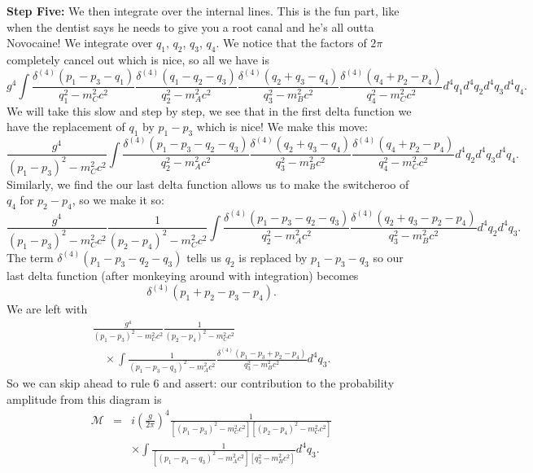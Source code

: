 \textbf{Step Five:} We then integrate over the internal lines. This is the fun 
part, like when the dentist says he needs to give you a root canal and he's
all outta Novocaine! We integrate over $q_1$, $q_2$, $q_3$, $q_4$. We notice
that the factors of $2\pi$ completely cancel out which is nice, so all we have
is
\begin{equation}
g^4\int\frac{\delta^{(4)}(p_{1}-p_{3}-q_{1})}{q_{1}^2 - m_{C}^2c^2}\frac{\delta^{(4)}(q_1 - q_2 - q_3)}{q_{2}^2 - m_{A}^2c^2}\frac{\delta^{(4)}(q_2 + q_3 - q_4)}{q_{3}^2 - m_{B}^2c^2}\frac{\delta^{(4)}(q_4 + p_2 - p_4)}{q_{4}^2-m_{C}^2c^2}d^{4}q_{1}d^{4}q_{2}d^{4}q_{3}d^{4}q_{4}.
\end{equation}
We will take this slow and step by step, we see that in the first delta function
we have the replacement of $q_1$ by $p_1-p_3$ which is nice! We make this move:
\begin{equation}
\frac{g^4}{(p_1-p_3)^2 - m_{C}^2c^2}\int\frac{\delta^{(4)}(p_1-p_3 - q_2 - q_3)}{q_{2}^2 - m_{A}^2c^2}\frac{\delta^{(4)}(q_2 + q_3 - q_4)}{q_{3}^2 - m_{B}^2c^2}\frac{\delta^{(4)}(q_4 + p_2 - p_4)}{q_{4}^2-m_{C}^2c^2}d^{4}q_{2}d^{4}q_{3}d^{4}q_{4}.
\end{equation}
Similarly, we find the our last delta function allows us to make the switcheroo
of $q_4$ for $p_2 - p_4$, so we make it so:
\begin{equation}
\frac{g^4}{(p_1-p_3)^2 - m_{C}^2c^2}\frac{1}{(p_2 - p_4)^2-m_{C}^2c^2}\int\frac{\delta^{(4)}(p_1-p_3 - q_2 - q_3)}{q_{2}^2 - m_{A}^2c^2}\frac{\delta^{(4)}(q_2 + q_3 - p_2 - p_4)}{q_{3}^2 - m_{B}^2c^2}d^{4}q_{2}d^{4}q_{3}.
\end{equation}
The term $\delta^{(4)}(p_1-p_3 - q_2 - q_3)$ tells us $q_2$ is replaced by
$p_1 - p_3 - q_3$ so our last delta function (after monkeying around with
integration) becomes
\begin{equation*}
\delta^{(4)}(p_1 + p_2 - p_3 - p_4).
\end{equation*}
We are left with
\begin{eqnarray}
\frac{g^4}{(p_1-p_3)^2 - m_{C}^2c^2}\frac{1}{(p_2 - p_4)^2-m_{C}^2c^2} \nonumber \\
\quad\times\int
\frac{1}{(p_1 - p_3 - q_3)^2 - m_{A}^2c^2}
\frac{\delta^{(4)}(p_1 - p_3 + p_2 - p_4)}{q_{3}^2 - m_{B}^2c^2}d^{4}q_{3}.
\end{eqnarray}
So we can skip ahead to rule 6 and assert: our contribution to the probability
amplitude from this diagram is
\begin{eqnarray}\label{divergentSonOfAGun}
\mathcal{M} &=& i\left(\frac{g}{2\pi}\right)^4\frac{1}{[(p_1-p_3)^2 - m_{C}^2c^2][(p_2 - p_4)^2-m_{C}^2c^2]} \nonumber\\
&&\times \int\frac{1}{[(p_1 - p_3 - q_3)^2 - m_{A}^2c^2][q_{3}^2 - m_{B}^2c^2]}d^{4}q_{3}.
\end{eqnarray}
